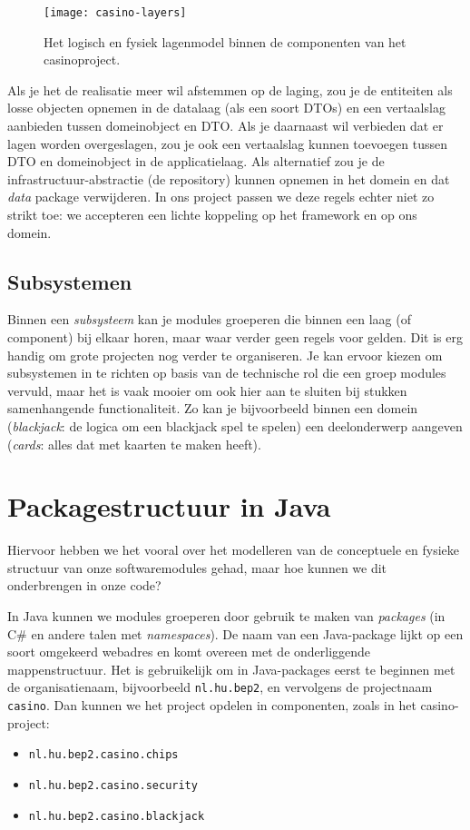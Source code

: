 \begin{figure}[H]
    \centering
    \texttt{[image: casino-layers]}
    \caption{Het logisch en fysiek lagenmodel binnen de componenten van het casinoproject.}
    \label{fig:casino-layers}
\end{figure}

Als je het de realisatie meer wil afstemmen op de laging, zou je de 
entiteiten als losse objecten opnemen in de datalaag (als een soort DTOs) 
en een vertaalslag aanbieden tussen domeinobject en DTO. Als je daarnaast 
wil verbieden dat er lagen worden overgeslagen, zou je ook een vertaalslag 
kunnen toevoegen tussen DTO en domeinobject in de applicatielaag.
Als alternatief zou je de infrastructuur-abstractie
(de repository) kunnen opnemen in het domein en dat \textit{data} package verwijderen.
In ons project passen we deze regels echter niet zo strikt toe:
we accepteren een lichte koppeling op het framework en op ons domein.

\subsection{Subsystemen}
Binnen een \emph{subsysteem} kan je modules groeperen die binnen 
een laag (of component) bij elkaar horen, maar waar verder geen 
regels voor gelden. Dit is erg handig om grote projecten nog verder 
te organiseren. Je kan ervoor kiezen om subsystemen in te richten op 
basis van de technische rol die een groep modules vervuld, maar het is 
vaak mooier om ook hier aan te sluiten bij stukken samenhangende functionaliteit.
Zo kan je bijvoorbeeld binnen een domein 
(\emph{blackjack}: de logica om een blackjack spel te spelen)
een deelonderwerp aangeven 
(\emph{cards}: alles dat met kaarten te maken heeft).

\section{Packagestructuur in Java}
Hiervoor hebben we het vooral over het modelleren van de conceptuele
en fysieke structuur van onze softwaremodules gehad, maar hoe kunnen we 
dit onderbrengen in onze code?

In Java kunnen we modules groeperen door gebruik te maken van 
\emph{packages} (in C\# en andere talen met \emph{namespaces}).
De naam van een Java-package lijkt op een soort omgekeerd webadres
en komt overeen met de onderliggende mappenstructuur.
Het is gebruikelijk om in Java-packages eerst te beginnen met de organisatienaam,
bijvoorbeeld \texttt{nl.hu.bep2}, en vervolgens de projectnaam \texttt{casino}.
Dan kunnen we het project opdelen in componenten, zoals in het casino-project: 
\begin{itemize}
\item \texttt{nl.hu.bep2.casino.chips}
\item \texttt{nl.hu.bep2.casino.security}
\item \texttt{nl.hu.bep2.casino.blackjack}
\end{itemize}

